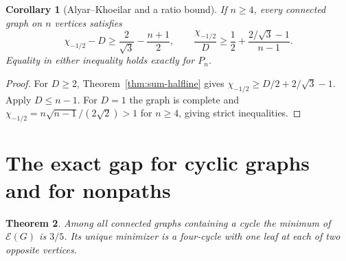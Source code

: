 \documentclass[11pt,a4paper]{article}
\newtheorem{theorem}{Theorem}[section]
\newtheorem{corollary}[theorem]{Corollary}
\newcommand{\gap}{\mathcal{E}}
\begin{document}
\begin{corollary}[Alyar--Khoeilar and a ratio bound]
If $n\ge4$, every connected graph on $n$ vertices satisfies
\[
 \chi_{-1/2}-D\ge\frac{2}{\sqrt3}-\frac{n+1}{2},
 \qquad
 \frac{\chi_{-1/2}}D\ge\frac12+\frac{2/\sqrt3-1}{n-1}.
\]
Equality in either inequality holds exactly for $P_n$.
\end{corollary}
\begin{proof}
For $D\ge2$, Theorem~\ref{thm:sum-halfline} gives
$\chi_{-1/2}\ge D/2+2/\sqrt3-1$. Apply $D\le n-1$. For $D=1$ the graph is complete and $\chi_{-1/2}=n\sqrt{n-1}/(2\sqrt2)>1$ for $n\ge4$, giving strict inequalities.
\end{proof}

\section{The exact gap for cyclic graphs and for nonpaths}\label{sec:gaps}
\begin{theorem}\label{thm:cyclic}
Among all connected graphs containing a cycle the minimum of $\gap(G)$ is $3/5$. Its unique minimizer is a four-cycle with one leaf at each of two opposite vertices.
\end{theorem}
\end{document}

